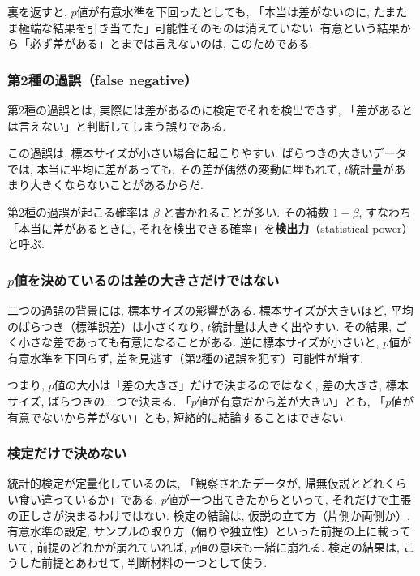     裏を返すと, $p$値が有意水準を下回ったとしても, 「本当は差がないのに, たまたま極端な結果を引き当てた」可能性そのものは消えていない.
    有意という結果から「必ず差がある」とまでは言えないのは, このためである.

    \subsubsection*{第2種の過誤（false negative）}

    第2種の過誤とは, 実際には差があるのに検定でそれを検出できず, 「差があるとは言えない」と判断してしまう誤りである.

    この過誤は, 標本サイズが小さい場合に起こりやすい.
    ばらつきの大きいデータでは, 本当に平均に差があっても, その差が偶然の変動に埋もれて, $t$統計量があまり大きくならないことがあるからだ.

    第2種の過誤が起こる確率は $\beta$ と書かれることが多い.
    その補数 $1 - \beta$, すなわち「本当に差があるときに, それを検出できる確率」を\textbf{検出力}（statistical power）と呼ぶ.

    \subsubsection*{\texorpdfstring{$p$}{p}値を決めているのは差の大きさだけではない}

    二つの過誤の背景には, 標本サイズの影響がある.
    標本サイズが大きいほど, 平均のばらつき（標準誤差）は小さくなり, $t$統計量は大きく出やすい.
    その結果, ごく小さな差であっても有意になることがある.
    逆に標本サイズが小さいと, $p$値が有意水準を下回らず, 差を見逃す（第2種の過誤を犯す）可能性が増す.

    つまり, $p$値の大小は「差の大きさ」だけで決まるのではなく, 差の大きさ, 標本サイズ, ばらつきの三つで決まる.
    「$p$値が有意だから差が大きい」とも, 「$p$値が有意でないから差がない」とも, 短絡的に結論することはできない.

    \subsubsection*{検定だけで決めない}

    統計的検定が定量化しているのは, 「観察されたデータが, 帰無仮説とどれくらい食い違っているか」である.
    $p$値が一つ出てきたからといって, それだけで主張の正しさが決まるわけではない.
    検定の結論は, 仮説の立て方（片側か両側か）, 有意水準の設定, サンプルの取り方（偏りや独立性）といった前提の上に載っていて, 前提のどれかが崩れていれば, $p$値の意味も一緒に崩れる.
    検定の結果は, こうした前提とあわせて, 判断材料の一つとして使う.


